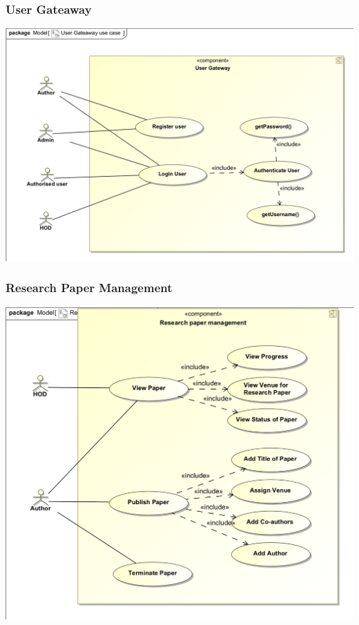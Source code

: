 \documentclass[11pt]{article}
\begin{document}
	\subsubsection{User Gateaway}
	\begin{center}
		\includegraphics[width=\textwidth]{../Diagrams/UseCases/UserGateway_UseCase.png}\\[0.5cm]
	\end{center}
	\newpage
	\subsubsection{Research Paper Management}
	\begin{center}
		\includegraphics[width=\textwidth]{../Diagrams/UseCases/ResearchPaperManagement_UseCase.png}\\[0.5cm]
	\end{center}
	\newpage
\end{document}
